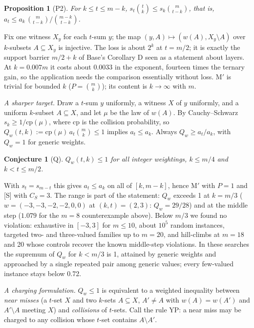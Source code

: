 \documentclass[11pt]{article}
\theoremstyle{plain}
\newtheorem*{proposition*}{Proposition}
\newtheorem*{conjecture*}{Conjecture}
\begin{document}
\begin{proposition*}[P2]
For $k \le t \le m - k$, $s_t\binom{t}{k} \le s_k\binom{m}{t-k}$, that is, $a_t \le a_k\,\binom{m}{t-k}\big/\binom{m-k}{t-k}$.
\end{proposition*}
Fix one witness $X_y$ for each $t$-sum $y$; the map $(y, A) \mapsto (w(A), X_y \setminus A)$ over $k$-subsets $A \subseteq X_y$ is injective. The loss is about $2^k$ at $t = m/2$; it is exactly the support barrier $m/2 + k$ of Base's Corollary D seen as a statement about layers. At $k = 0.007m$ it costs about $0.0033$ in the exponent, fourteen times the ternary gain, so the application needs the comparison essentially without loss. M$'$ is trivial for bounded $k$ ($P = \binom{m}{k}$); its content is $k \to \infty$ with $m$.

\emph{A sharper target.} Draw a $t$-sum $y$ uniformly, a witness $X$ of $y$ uniformly, and a uniform $k$-subset $A \subseteq X$, and let $\mu$ be the law of $w(A)$. By Cauchy--Schwarz $s_k \ge 1/\mathrm{cp}(\mu)$, where $\mathrm{cp}$ is the collision probability, so $Q_w(t,k) := \mathrm{cp}(\mu)\, a_t \binom{m}{k} \le 1$ implies $a_t \le a_k$. Always $Q_w \ge a_t/a_k$, with $Q_w = 1$ for generic weights.

\begin{conjecture*}[Q]
$Q_w(t,k) \le 1$ for all integer weightings, $k \le m/4$ and $k < t \le m/2$.
\end{conjecture*}
With $s_t = s_{m-t}$ this gives $a_t \le a_k$ on all of $[k, m-k]$, hence M$'$ with $P = 1$ and [S] with $C_S = 3$. The range is part of the statement: $Q_w$ exceeds 1 at $k = m/3$ ($w = (-3,-3,-2,-2,0,0)$ at $(k,t) = (2,3)$: $Q_w = 29/28$) and at the middle step ($1.079$ for the $m = 8$ counterexample above). Below $m/3$ we found no violation: exhaustive in $[-3,3]$ for $m \le 10$, about $10^5$ random instances, targeted two- and three-valued families up to $m = 20$, and hill-climbs at $m = 18$ and 20 whose controls recover the known middle-step violations. In these searches the supremum of $Q_w$ for $k < m/3$ is 1, attained by generic weights and approached by a single repeated pair among generic values; every few-valued instance stays below 0.72.

\emph{A charging formulation.} $Q_w \le 1$ is equivalent to a weighted inequality between \emph{near misses} (a $t$-set $X$ and two $k$-sets $A \subseteq X$, $A' \ne A$ with $w(A) = w(A')$ and $A' \setminus A$ meeting $X$) and \emph{collisions} of $t$-sets. Call the rule YP: a near miss may be charged to any collision whose $t$-set contains $A \setminus A'$.
\end{document}
